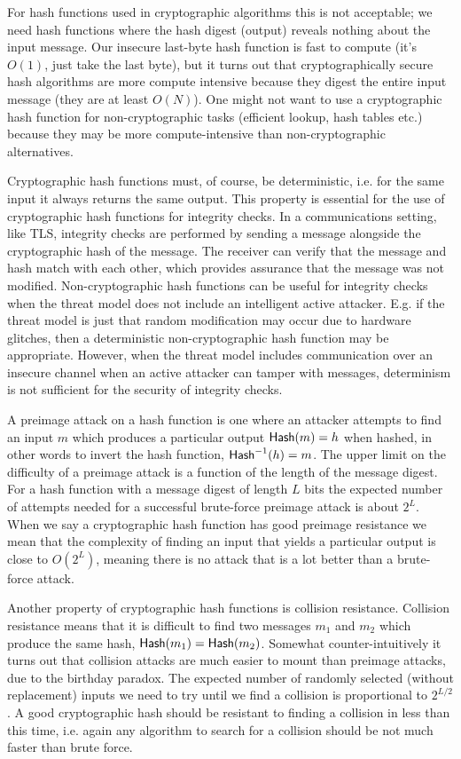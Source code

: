 For hash functions used in cryptographic algorithms this is not acceptable; we need hash functions where the hash digest (output) reveals nothing about the input message. Our insecure last-byte hash function is fast to compute (it's $O(1)$, just take the last byte), but it turns out that cryptographically secure hash algorithms are more compute intensive because they digest the entire input message (they are at least $O(N)$). One might not want to use a cryptographic hash function for non-cryptographic tasks (efficient lookup, hash tables etc.) because they may be more compute-intensive than non-cryptographic alternatives.

Cryptographic hash functions must, of course, be deterministic, i.e. for the same input it always returns the same output.
This property is essential for the use of cryptographic hash functions for integrity checks. In a communications setting,
like \ac{TLS}, integrity checks are performed by sending a message alongside the cryptographic hash of the message.
The receiver can verify that the message and hash match with each other, which provides assurance that
the message was not modified.
Non-cryptographic hash functions can be useful for integrity checks when the threat model does not include an
intelligent active attacker. E.g. if the threat model is just that random modification may occur due to hardware glitches,
then a deterministic non-cryptographic hash function may be appropriate.
However,
when the threat model includes communication over an insecure channel when an active attacker can tamper with messages,
determinism is not sufficient for the security of integrity checks.

A preimage attack on a hash function is one where an attacker attempts to find an input $m$ which produces a particular output $\text{\textsf{Hash}}(m)=h$ when hashed, in other words to invert the hash function, $\text{\textsf{Hash}}^{-1}(h)=m$. The upper limit on the difficulty of a preimage attack is a function of the length of the message digest. For a hash function with a message digest of length $L$ bits the expected number of attempts needed for a successful brute-force preimage attack is about $2^L$. When we say a cryptographic hash function has good preimage resistance we mean that the complexity of finding an input that yields a particular output is close to $O(2^L)$,
meaning there is no attack that is a lot better than a brute-force attack.

Another property of cryptographic hash functions is collision resistance. Collision resistance means that it is difficult to find two messages $m_1$ and $m_2$ which produce the same hash, $\text{\textsf{Hash}}(m_1)=\text{\textsf{Hash}}(m_2)$. Somewhat counter-intuitively it turns out that collision attacks are much easier to mount than preimage attacks, due to the birthday paradox. The expected number of randomly selected (without replacement) inputs we need to try until we find a collision is proportional to $2^{L/2}$. A good cryptographic hash should be resistant to finding a collision in less than this time, i.e. again any algorithm to search for a collision should be not much faster than brute force.

